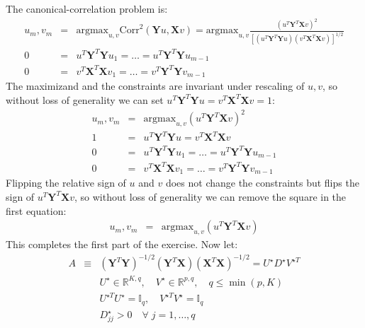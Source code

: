 


The canonical-correlation problem is:
\begin{eqnarray*}
    u_m, v_m & = & \textrm{argmax}_{u, v} \textrm{Corr}^2 \left( \mathbf{Y} u, \mathbf{X} v \right)
    =  \textrm{argmax}_{u, v} \frac{\left( u ^T \mathbf{Y}^T \mathbf{X} v \right)^2}{ \left[ \left( u^T \mathbf{Y}^T \mathbf{Y} u  \right) \left( v^T \mathbf{X}^T \mathbf{X} v \right) \right] ^{1/2}}\\
    0 & = & u^T \mathbf{Y}^T \mathbf{Y} u_1 = \ldots = u ^T \mathbf{Y}^T \mathbf{Y} u_{m - 1} \\
    0 & = & v^T \mathbf{X}^T \mathbf{X} v_1 = \ldots = v^T \mathbf{Y}^T \mathbf{Y} v_{m - 1}
\end{eqnarray*}
The maximizand and the constraints are invariant under rescaling of $u, v$, so without loss of generality we can set $u ^T \mathbf{Y}^T \mathbf{Y} u = v^T \mathbf{X}^T \mathbf{X} v = 1$:
\begin{eqnarray*}
    u_m, v_m & = & \textrm{argmax}_{u, v} \left( u ^T \mathbf{Y}^T \mathbf{X} v \right)^2 \\
    1 & = &u ^T \mathbf{Y}^T \mathbf{Y} u = v^T \mathbf{X}^T \mathbf{X} v \\
    0 & = & u^T \mathbf{Y}^T \mathbf{Y} u_1 = \ldots = u ^T \mathbf{Y}^T \mathbf{Y} u_{m - 1} \\
    0 & = & v^T \mathbf{X}^T \mathbf{X} v_1 = \ldots = v^T \mathbf{Y}^T \mathbf{Y} v_{m - 1}
\end{eqnarray*}
Flipping the relative sign of $u$ and $v$ does not change the constraints but
flips the sign of $u ^T \mathbf{Y}^T \mathbf{X} v$, so without loss of generality
we can remove the square in the first equation:
\begin{eqnarray*}
    u_m, v_m & = & \textrm{argmax}_{u, v} \left( u ^T \mathbf{Y}^T \mathbf{X} v \right)
\end{eqnarray*}
This completes the first part of the exercise. Now let:
\begin{eqnarray*}
    A & \equiv & \left( \mathbf{Y}^T \mathbf{Y} \right)^{-1/2} \left( \mathbf{Y}^T \mathbf{X} \right) \left( \mathbf{X} ^T \mathbf{X} \right)^{-1/2} = U ^{\star} D ^{\star} V^{\star T}\\
    && U ^{\star} \in \mathbb{R}^{K, q}, \quad V ^{\star} \in \mathbb{R}^{p, q}, \quad q \leq \min{(p, K)}\\
    &&U ^{\star T} U ^{\star} = \mathbb{I}_q, \quad V ^{\star T} V ^{\star} = \mathbb{I}_q\\
    && D ^{\star}_{jj} > 0\quad \forall\; j = 1, \ldots, q
\end{eqnarray*}
